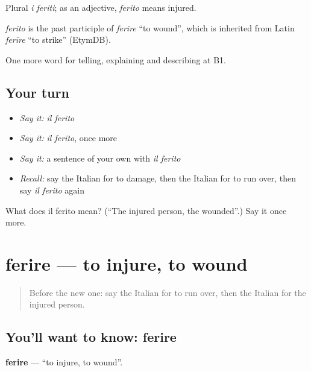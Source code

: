 Plural \emph{i feriti}; as an adjective, \emph{ferito} means injured.

\begin{cousinweb}
\emph{ferito} is the past participle of \emph{ferire} \textquotedblleft{}to wound\textquotedblright{}, which is inherited from Latin \emph{ferīre} \textquotedblleft{}to strike\textquotedblright{} (EtymDB).
\end{cousinweb}

\begin{grammarlens}[title={What you've built}]
One more word for telling, explaining and describing at B1.
\end{grammarlens}

\subsection*{Your turn}
\begin{itemize}
\raggedright
  \item \emph{Say it:} \emph{il ferito}
  \item \emph{Say it:} \emph{il ferito}, once more
  \item \emph{Say it:} a sentence of your own with \emph{il ferito}
  \item \emph{Recall:} say the Italian for to damage, then the Italian for to run over, then say \emph{il ferito} again
\end{itemize}

\begin{tcolorbox}[breakable,colback=teal!4,colframe=teal!35!black,title={Before you move on}]
What does il ferito mean? (\textquotedblleft{}The injured person, the wounded\textquotedblright{}.) Say it once more.
\end{tcolorbox}
\section[ferire]{ferire — to injure, to wound}

\label{lesson:IT-C300-ferire}



\begin{quote}
Before the new one: say the Italian for to run over, then the Italian for the injured person.
\end{quote}

\subsection*{You'll want to know: ferire}
\textbf{ferire} — \textquotedblleft{}to injure, to wound\textquotedblright{}.

